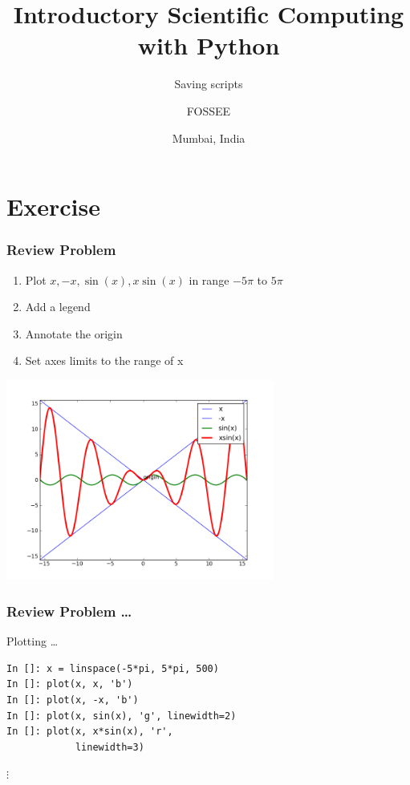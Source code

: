 \documentclass[14pt,compress]{beamer}
\title[Interactive Plotting]{Introductory Scientific Computing with
Python}
\subtitle{Saving scripts}
\author[FOSSEE] {FOSSEE}
\institute[IIT Bombay] {Department of Aerospace Engineering\\IIT Bombay}
\date[] {Mumbai, India
}
\begin{document}
\begin{frame}
  \maketitle
\end{frame}


\section{Exercise}

\begin{frame}
\frametitle{Review Problem}
\begin{enumerate}
\item Plot $x, -x, \sin(x), x \sin(x)$ in range $-5\pi$ to $5\pi$
\item Add a legend
\item Annotate the origin
\item Set axes limits to the range of x
\end{enumerate}
\vspace*{-0.15in}
\begin{center}
  \includegraphics[height=2.6in, interpolate=true]{data/four_plot}
\end{center}
\end{frame}

\begin{frame}[fragile]
\frametitle{Review Problem \ldots}
\alert{Plotting \ldots}
\begin{lstlisting}
In []: x = linspace(-5*pi, 5*pi, 500)
In []: plot(x, x, 'b')
In []: plot(x, -x, 'b')
In []: plot(x, sin(x), 'g', linewidth=2)
In []: plot(x, x*sin(x), 'r',
            linewidth=3)
\end{lstlisting}
$\vdots$
\end{frame}
\end{document}
